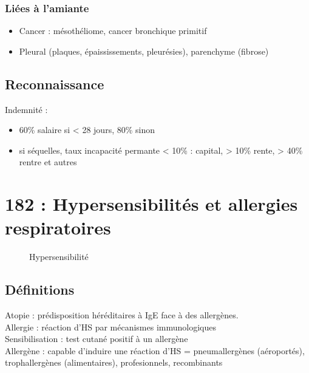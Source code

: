 \subsubsection{Liées à l'amiante}
\begin{itemize}
  \item Cancer : mésothéliome, cancer bronchique primitif
  \item Pleural (plaques, épaississements, pleurésies), parenchyme (fibrose)
\end{itemize}
\subsection{Reconnaissance}
Indemnité : 
\begin{itemize}
  \item 60\% salaire si < 28 jours, 80\% sinon
  \item si séquelles, taux incapacité permante < 10\% : capital, > 10\% rente, > 40\%
    rentre et autres
\end{itemize}

\section{182 : Hypersensibilités et allergies respiratoires}%
\label{sec:182_hypersensibilites_et_allergies_respiratoires}

\begin{figure}[htpb]
  \centering
  \caption{Hypersensibilité}
\end{figure}
\subsection{Définitions}%
Atopie : prédisposition héréditaires à IgE face à des allergènes.\\
Allergie : réaction d'HS par mécanismes immunologiques\\
Sensibilisation : test cutané positif à un allergène\\
Allergène : capable d'induire une réaction d'HS = pneumallergènes (aéroportés),
trophallergènes (alimentaires), profesionnels, recombinants

